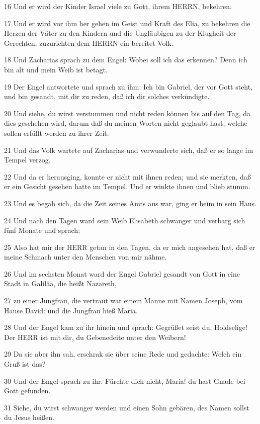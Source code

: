 \par 16 Und er wird der Kinder Israel viele zu Gott, ihrem HERRN, bekehren.
\par 17 Und er wird vor ihm her gehen im Geist und Kraft des Elia, zu bekehren die Herzen der Väter zu den Kindern und die Ungläubigen zu der Klugheit der Gerechten, zuzurichten dem HERRN ein bereitet Volk.
\par 18 Und Zacharias sprach zu dem Engel: Wobei soll ich das erkennen? Denn ich bin alt und mein Weib ist betagt.
\par 19 Der Engel antwortete und sprach zu ihm: Ich bin Gabriel, der vor Gott steht, und bin gesandt, mit dir zu reden, daß ich dir solches verkündigte.
\par 20 Und siehe, du wirst verstummen und nicht reden können bis auf den Tag, da dies geschehen wird, darum daß du meinen Worten nicht geglaubt hast, welche sollen erfüllt werden zu ihrer Zeit.
\par 21 Und das Volk wartete auf Zacharias und verwunderte sich, daß er so lange im Tempel verzog.
\par 22 Und da er herausging, konnte er nicht mit ihnen reden; und sie merkten, daß er ein Gesicht gesehen hatte im Tempel. Und er winkte ihnen und blieb stumm.
\par 23 Und es begab sich, da die Zeit seines Amts aus war, ging er heim in sein Haus.
\par 24 Und nach den Tagen ward sein Weib Elisabeth schwanger und verbarg sich fünf Monate und sprach:
\par 25 Also hat mir der HERR getan in den Tagen, da er mich angesehen hat, daß er meine Schmach unter den Menschen von mir nähme.
\par 26 Und im sechsten Monat ward der Engel Gabriel gesandt von Gott in eine Stadt in Galiläa, die heißt Nazareth,
\par 27 zu einer Jungfrau, die vertraut war einem Manne mit Namen Joseph, vom Hause David: und die Jungfrau hieß Maria.
\par 28 Und der Engel kam zu ihr hinein und sprach: Gegrüßet seist du, Holdselige! Der HERR ist mit dir, du Gebenedeite unter den Weibern!
\par 29 Da sie aber ihn sah, erschrak sie über seine Rede und gedachte: Welch ein Gruß ist das?
\par 30 Und der Engel sprach zu ihr: Fürchte dich nicht, Maria! du hast Gnade bei Gott gefunden.
\par 31 Siehe, du wirst schwanger werden und einen Sohn gebären, des Namen sollst du Jesus heißen.
